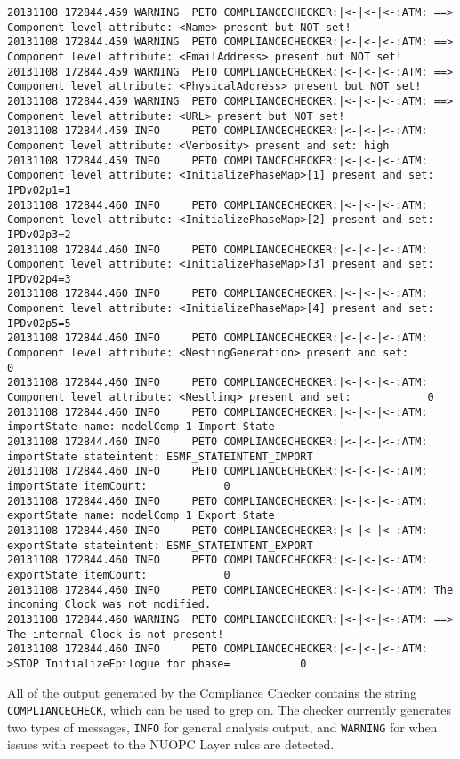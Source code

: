 {\begin{verbatim}
20131108 172844.459 WARNING  PET0 COMPLIANCECHECKER:|<-|<-|<-:ATM: ==> Component level attribute: <Name> present but NOT set!
20131108 172844.459 WARNING  PET0 COMPLIANCECHECKER:|<-|<-|<-:ATM: ==> Component level attribute: <EmailAddress> present but NOT set!
20131108 172844.459 WARNING  PET0 COMPLIANCECHECKER:|<-|<-|<-:ATM: ==> Component level attribute: <PhysicalAddress> present but NOT set!
20131108 172844.459 WARNING  PET0 COMPLIANCECHECKER:|<-|<-|<-:ATM: ==> Component level attribute: <URL> present but NOT set!
20131108 172844.459 INFO     PET0 COMPLIANCECHECKER:|<-|<-|<-:ATM: Component level attribute: <Verbosity> present and set: high
20131108 172844.459 INFO     PET0 COMPLIANCECHECKER:|<-|<-|<-:ATM: Component level attribute: <InitializePhaseMap>[1] present and set: IPDv02p1=1
20131108 172844.460 INFO     PET0 COMPLIANCECHECKER:|<-|<-|<-:ATM: Component level attribute: <InitializePhaseMap>[2] present and set: IPDv02p3=2
20131108 172844.460 INFO     PET0 COMPLIANCECHECKER:|<-|<-|<-:ATM: Component level attribute: <InitializePhaseMap>[3] present and set: IPDv02p4=3
20131108 172844.460 INFO     PET0 COMPLIANCECHECKER:|<-|<-|<-:ATM: Component level attribute: <InitializePhaseMap>[4] present and set: IPDv02p5=5
20131108 172844.460 INFO     PET0 COMPLIANCECHECKER:|<-|<-|<-:ATM: Component level attribute: <NestingGeneration> present and set:            0
20131108 172844.460 INFO     PET0 COMPLIANCECHECKER:|<-|<-|<-:ATM: Component level attribute: <Nestling> present and set:            0
20131108 172844.460 INFO     PET0 COMPLIANCECHECKER:|<-|<-|<-:ATM: importState name: modelComp 1 Import State
20131108 172844.460 INFO     PET0 COMPLIANCECHECKER:|<-|<-|<-:ATM: importState stateintent: ESMF_STATEINTENT_IMPORT
20131108 172844.460 INFO     PET0 COMPLIANCECHECKER:|<-|<-|<-:ATM: importState itemCount:            0
20131108 172844.460 INFO     PET0 COMPLIANCECHECKER:|<-|<-|<-:ATM: exportState name: modelComp 1 Export State
20131108 172844.460 INFO     PET0 COMPLIANCECHECKER:|<-|<-|<-:ATM: exportState stateintent: ESMF_STATEINTENT_EXPORT
20131108 172844.460 INFO     PET0 COMPLIANCECHECKER:|<-|<-|<-:ATM: exportState itemCount:            0
20131108 172844.460 INFO     PET0 COMPLIANCECHECKER:|<-|<-|<-:ATM: The incoming Clock was not modified.
20131108 172844.460 WARNING  PET0 COMPLIANCECHECKER:|<-|<-|<-:ATM: ==> The internal Clock is not present!
20131108 172844.460 INFO     PET0 COMPLIANCECHECKER:|<-|<-|<-:ATM: >STOP InitializeEpilogue for phase=           0
\end{verbatim}
}

All of the output generated by the Compliance Checker contains the string {\tt COMPLIANCECHECK}, which can be used to grep on. The checker currently generates two types of messages, {\tt INFO} for general analysis output, and {\tt WARNING} for when issues with respect to the NUOPC Layer rules are detected.

